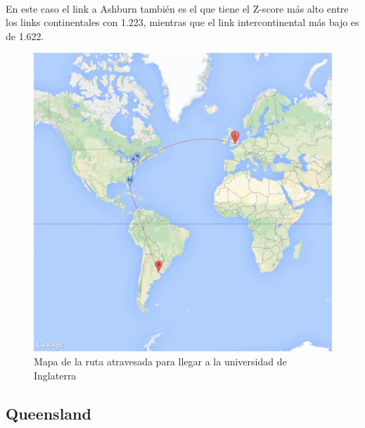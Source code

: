 ~

En este caso el link a Ashburn tambi\'en es el que tiene el Z-score m\'as alto entre los links
continentales con 1.223, mientras que el link intercontinental m\'as bajo es de 1.622.

\begin{figure}[H]
	\begin{center}
		  \includegraphics[scale=0.2]{../results/maps/Oxford.png}
		  \caption{Mapa de la ruta atravesada para llegar a la universidad de Inglaterra}
	\end{center}
\end{figure}


\newpage

\subsection{Queensland}

